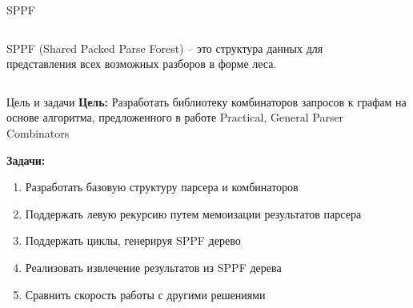 \documentclass[aspectratio=169]{beamer}
\begin{document}
\begin{frame}{SPPF}
  \begin{columns}[c]
    \begin{column}{0.5\textwidth}
      SPPF (Shared Packed Parse Forest) -- это структура данных для представления всех возможных разборов в форме леса.
    \end{column}
    \begin{column}{0.55\textwidth}
    \end{column}
  \end{columns}
\end{frame}

\begin{frame}{Цель и задачи}
  \textbf{Цель:} Разработать библиотеку комбинаторов запросов к графам на основе алгоритма, предложенного в работе Practical, General Parser Combinators

  \textbf{Задачи:}
  \begin{enumerate}
    \item Разработать базовую структуру парсера и комбинаторов
    \item Поддержать левую рекурсию путем мемоизации результатов парсера
    \item Поддержать циклы, генерируя SPPF дерево
    \item Реализовать извлечение результатов из SPPF дерева
    \item Сравнить скорость работы с другими решениями
  \end{enumerate}
\end{frame}
\end{document}
